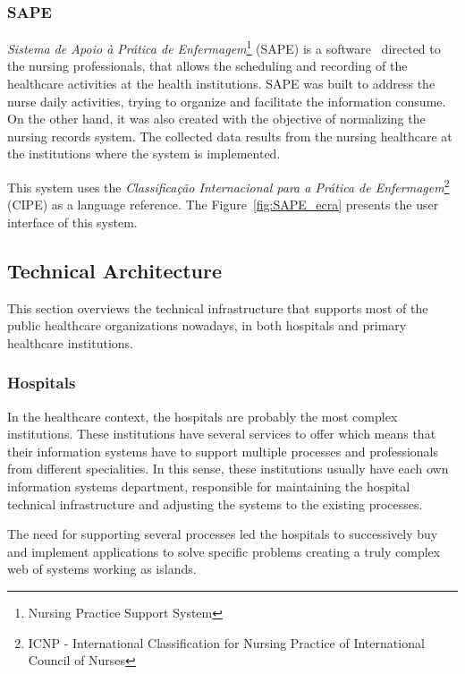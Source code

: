 \subsubsection{SAPE}
\textit{Sistema de Apoio à Prática de Enfermagem}\footnote{Nursing Practice Support System} (SAPE) is a software~\citep{ACSS_SAPE2010} directed to the nursing professionals, that allows the scheduling and recording of the healthcare activities at the health institutions. SAPE was built to address the nurse daily activities, trying to organize and facilitate the information consume. On the other hand, it was also created with the objective of normalizing the nursing records system. The collected data results from the nursing healthcare at the institutions where the system is implemented.

This system uses the \textit{Classificação Internacional para a Prática de Enfermagem}\footnote{ICNP - International Classification for Nursing Practice of International Council of Nurses} (CIPE) as a language reference. The Figure~\ref{fig:SAPE_ecra} presents the user interface of this system.



\subsection{Technical Architecture}

This section overviews the technical infrastructure that supports most of the public healthcare organizations nowadays, in both hospitals and primary healthcare institutions.

\subsubsection{Hospitals}

In the healthcare context, the hospitals are probably the most complex institutions. These institutions have several services to offer which means that their information systems have to support multiple processes and professionals from different specialities. In this sense, these institutions usually have each own information systems department, responsible for maintaining the hospital technical infrastructure and adjusting the systems to the existing processes.

The need for supporting several processes led the hospitals to successively buy and implement applications to solve specific problems creating a truly complex web of systems working as islands. 

